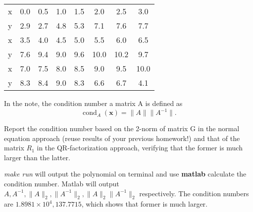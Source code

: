 \documentclass[a4paper]{book}
\numberwithin{equation}{chapter}
\theoremstyle{definition}
\begin{document}
\begin{tabular}{c | c c c c c c c}
  \toprule 
  x & 0.0 & 0.5 & 1.0 & 1.5 & 2.0 & 2.5 & 3.0 \\
  y & 2.9 & 2.7 & 4.8 & 5.3 & 7.1 & 7.6 & 7.7 \\
  \midrule 
  x & 3.5 & 4.0 & 4.5 & 5.0 & 5.5 & 6.0 & 6.5 \\
  y & 7.6 & 9.4 & 9.0 & 9.6 & 10.0 & 10.2 & 9.7 \\
  \midrule 
  x & 7.0 & 7.5 & 8.0 & 8.5 & 9.0 & 9.5 & 10.0 \\
  y & 8.3 & 8.4 & 9.0 & 8.3 & 6.6 & 6.7 & 4.1 \\
  \bottomrule
\end{tabular}

In the note, the condition number a matrix A is defined as
\[\operatorname{cond}_A(\mathbf{x}) = \lVert A \rVert \lVert A^{-1} \rVert. \]

Report the condition number based on the 2-norm of matrix G in the normal equation approach (reuse results of your previous homework!) and that of the matrix $R_1$ in the QR-factorization approach, verifying that the former is much larger than the latter.

\textit{make run} will output the polynomial on terminal and use \textbf{matlab} calculate the condition number. Matlab will output $A, A^{-1}, \lVert A \rVert_2,\lVert A^{-1} \rVert_2,\lVert A \rVert_2\lVert A^{-1} \rVert_2 $ respectively. The condition numbers are $1.8981 \times 10^4, 137.7715$, which shows that former is much larger.


%   

%   

%   


\end{document}

